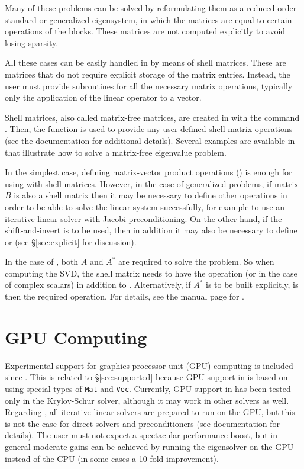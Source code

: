 	Many of these problems can be solved by reformulating them as a reduced-order standard or generalized eigensystem, in which the matrices are equal to certain operations of the blocks. These matrices are not computed explicitly to avoid losing sparsity.

	All these cases can be easily handled in \slepc by means of shell matrices. These are matrices that do not require explicit storage of the matrix entries. Instead, the user must provide subroutines for all the necessary matrix operations, typically only the application of the linear operator to a vector. 

	Shell matrices, also called matrix-free matrices, are created in \petsc with the command . Then, the function  is used to provide any user-defined shell matrix operations (see the \petsc{} documentation for additional details). Several examples are available in \slepc that illustrate how to solve a matrix-free eigenvalue problem.

	In the simplest case, defining matrix-vector product operations () is enough for using  with shell matrices. However, in the case of generalized problems, if matrix $B$ is also a shell matrix then it may be necessary to define other operations in order to be able to solve the linear system successfully, for example  to use an iterative linear solver with Jacobi preconditioning. On the other hand, if the shift-and-invert  is to be used, then in addition it may also be necessary to define  or  (see \S\ref{sec:explicit} for discussion).

	In the case of , both $A$ and $A^*$ are required to solve the problem. So when computing the SVD, the shell matrix needs to have the  operation (or  in the case of complex scalars) in addition to . Alternatively, if $A^*$ is to be built explicitly,  is then the required operation. For details, see the manual page for .

\section{GPU Computing}
\label{sec:gpu}

Experimental support for graphics processor unit (GPU) computing is included since . This is related to \S\ref{sec:supported} because GPU support in \petsc is based on using special types of \texttt{Mat} and \texttt{Vec}. Currently, GPU support in \slepc has been tested only in the Krylov-Schur  solver, although it may work in other solvers as well. Regarding \petsc, all iterative linear solvers are prepared to run on the GPU, but this is not the case for direct solvers and preconditioners (see \petsc documentation for details). The user must not expect a spectacular performance boost, but in general moderate gains can be achieved by running the eigensolver on the GPU instead of the CPU (in some cases a 10-fold improvement).

